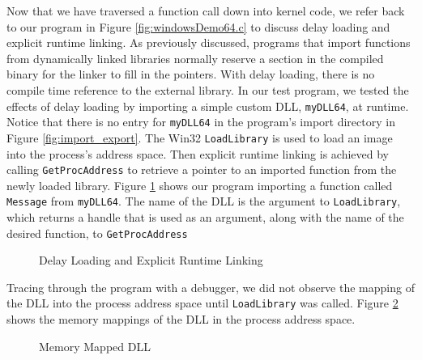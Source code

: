 \documentclass[preprint,12pt]{elsarticle}
\begin{document}
Now that we have traversed a function call down into kernel code, we refer back to our program in Figure \ref{fig:windowsDemo64.c} to discuss delay loading and explicit runtime linking. As previously discussed, programs that import functions from dynamically linked libraries normally reserve a section in the compiled binary for the linker to fill in the pointers. With delay loading, there is no compile time reference to the external library. In our test program, we tested the effects of delay loading by importing a simple custom DLL, \texttt{myDLL64}, at runtime. Notice that there is no entry for \texttt{myDLL64} in the program's import directory in Figure \ref{fig:import_export}. The Win32 \texttt{LoadLibrary} is used to load an image into the process's address space. Then explicit runtime linking is achieved by calling \texttt{GetProcAddress} to retrieve a pointer to an imported function from the newly loaded library. Figure \ref{fig:delayloading} shows our program importing a function called \texttt{Message} from \texttt{myDLL64}. The name of the DLL is the argument to \texttt{LoadLibrary}, which returns a handle that is used as an argument, along with the name of the desired function, to \texttt{GetProcAddress}

\begin{figure}[ht]
\centering{}
\caption{Delay Loading and Explicit Runtime Linking}
\label{fig:delayloading}
\end{figure}

Tracing through the program with a debugger, we did not observe the mapping of the DLL into the process address space until \texttt{LoadLibrary} was called. Figure \ref{fig:memorymap} shows the memory mappings of the DLL in the process address space.

\begin{figure}[ht]
\centering{}
\caption{Memory Mapped DLL}
\label{fig:memorymap}
\end{figure}
\end{document}
